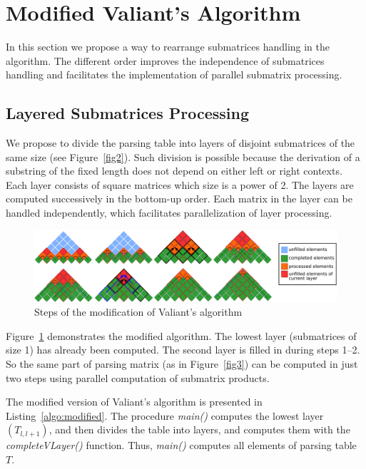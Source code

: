 \section{Modified Valiant's Algorithm}

In this section we propose a way to rearrange submatrices handling in the algorithm.
The different order improves the independence of submatrices handling and facilitates the implementation of parallel submatrix processing.

\subsection{Layered Submatrices Processing}

We propose to divide the parsing table into layers of disjoint submatrices of the same size (see Figure~\ref{fig2}).
Such division is possible because the derivation of a substring of the fixed length does not depend on either left or right contexts.
Each layer consists of square matrices which size is a power of 2.
The layers are computed successively in the bottom-up order.
Each matrix in the layer can be handled independently, which facilitates parallelization of layer processing.

\begin{figure}[h]
\vspace{3mm}
 \begin{center}
 \includegraphics[width=12cm]{pictures/modivis2.pdf}
    \caption{Steps of the modification of Valiant's algorithm}
    \label{fig4}
 \end{center}
\vspace{-8mm}
\end{figure}

Figure~\ref{fig4} demonstrates the modified algorithm.
The lowest layer (submatrices of size 1) has already been computed.
The second layer is filled in during steps 1--2.
So the same part of parsing matrix (as in Figure~\ref{fig3}) can be computed in just two steps using parallel computation of submatrix products.

The modified version of Valiant's algorithm is presented in Listing~\ref{algo:modified}.
The procedure \textit{main()} computes the lowest layer $(T_{l, l+1})$, and then divides the table into layers, and computes them with the \textit{completeVLayer()} function.
Thus, \textit{main()} computes all elements of parsing table $T$.


